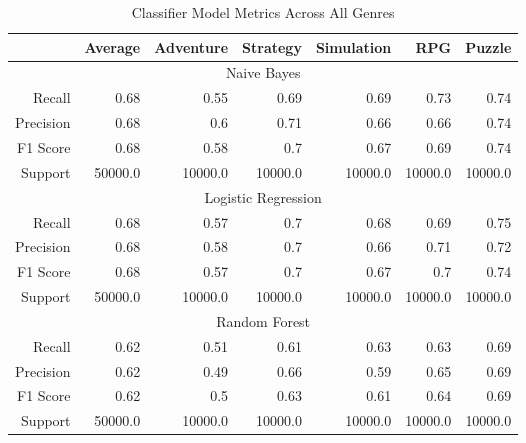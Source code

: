 \begin{table}[h]
    \centering
    \begin{tabular}{r|r|r|r|r|r|r}
        & Average & Adventure & Strategy & Simulation & RPG & Puzzle \\\hline
        \multicolumn{7}{c}{Naive Bayes} \\\hline
        Recall      & 0.68 & 0.55 & 0.69 & 0.69 & 0.73 & 0.74 \\
        Precision   & 0.68 & 0.6 & 0.71 & 0.66 & 0.66 & 0.74 \\
        F1 Score    & 0.68 & 0.58 & 0.7 & 0.67 & 0.69 & 0.74 \\
        Support     & 50000.0 & 10000.0 & 10000.0 & 10000.0 & 10000.0 & 10000.0 \\\hline
        \multicolumn{7}{c}{Logistic Regression} \\\hline
        Recall      & 0.68 & 0.57 & 0.7 & 0.68 & 0.69 & 0.75 \\
        Precision   & 0.68 & 0.58 & 0.7 & 0.66 & 0.71 & 0.72 \\
        F1 Score    & 0.68 & 0.57 & 0.7 & 0.67 & 0.7 & 0.74 \\
        Support     & 50000.0 & 10000.0 & 10000.0 & 10000.0 & 10000.0 & 10000.0 \\\hline
        \multicolumn{7}{c}{Random Forest} \\\hline
        Recall      & 0.62 & 0.51 & 0.61 & 0.63 & 0.63 & 0.69 \\
        Precision   & 0.62 & 0.49 & 0.66 & 0.59 & 0.65 & 0.69 \\
        F1 Score    & 0.62 & 0.5 & 0.63 & 0.61 & 0.64 & 0.69 \\
        Support     & 50000.0 & 10000.0 & 10000.0 & 10000.0 & 10000.0 & 10000.0 \\\hline
    \end{tabular}
    \caption{Classifier Model Metrics Across All Genres}
    \label{tab:combined_model_metrics}
\end{table}